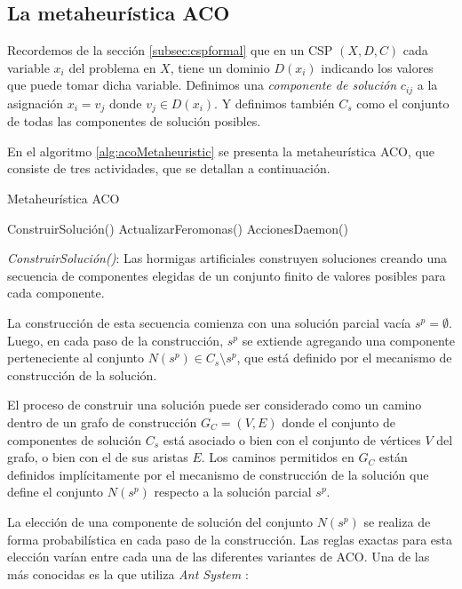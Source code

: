\documentclass{llncs}
\begin{document}
  \subsection{La metaheurística ACO}
  	Recordemos de la sección \ref{subsec:cspformal} que en un CSP $(X, D, C)$ cada variable
 	 $x_i$ del problema en $X$, tiene un dominio $D(x_i)$ indicando los valores que puede tomar
  	dicha variable. Definimos una \textit{componente de solución} $c_{ij}$ a la asignación $x_i = v_j$ donde $v_j \in D(x_i)$. 
  	Y definimos también $C_s$ como el conjunto de todas las componentes de solución posibles.
  
  	En el algoritmo \ref{alg:acoMetaheuristic} se presenta la metaheurística ACO, que consiste de tres
  	actividades, que se detallan a continuación.
  	
  	\begin{algorithm}[H]
  	\caption{Metaheurística ACO}
  	\label{alg:acoMetaheuristic}
  	\begin{algorithmic}[1]
  		\State ConstruirSolución()
  		\State ActualizarFeromonas()
  		\State AccionesDaemon() 
  		\EndWhile
  	\end{algorithmic}
	\end{algorithm}
	\bigbreak
	\textit{ConstruirSolución()}: Las hormigas artificiales construyen soluciones creando una secuencia de componentes elegidas de un conjunto finito de valores posibles para cada componente. 
	
	La construcción de esta secuencia comienza con una solución parcial vacía 
	$s^p = \emptyset$. Luego, en cada paso de la construcción, $s^p$ se extiende agregando una
	componente perteneciente al conjunto $N(s^p) \in C_s \setminus s^p$, que está definido por 
	el mecanismo de construcción de la solución.
	
	El proceso de construir una solución puede ser considerado como un camino dentro de un grafo
	de construcción $G_C = (V, E)$ donde el conjunto de componentes de solución $C_s$ está
	asociado o bien con el conjunto de vértices $V$ del grafo, o bien con el de sus aristas $E$. Los caminos permitidos en $G_C$ están definidos implícitamente por el mecanismo de construcción de la solución que define el conjunto $N(s^p)$ respecto a la solución parcial $s^p$.
	
	La elección de una componente de solución del conjunto $N(s^p)$ se realiza de forma probabilística 
	en cada paso de la construcción. Las reglas exactas para esta elección varían entre
	cada una de las diferentes variantes de ACO. Una de las más conocidas es la que utiliza \textit{Ant System} \cite{dor:man:col}:
	
\end{document}
